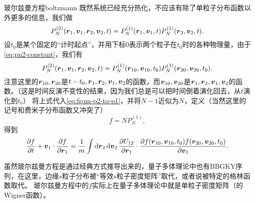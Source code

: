 \begin{back}{玻尔兹曼方程}{boltzmann}
    既然系统已经充分热化，不应该有除了单粒子分布函数以外更多的信息，我们做
    \begin{equation}
        P^{(2)}_N(\vb*{r}_1, \vb*{v}_1, \vb*{r}_2, \vb*{v}_2, t) = P^{(1)}_N(\vb*{r}_1, \vb*{v}_1, t) P^{(1)}_N(\vb*{r}_2, \vb*{v}_2, t).
    \end{equation}
    设$t_0$是某个固定的“计时起点”，并用下标0表示两个粒子在$t_0$时的各种物理量，由于\eqref{eq:pn2-constant}，我们有
    \[
        P^{(2)}_N(\vb*{r}_1, \vb*{v}_1, \vb*{r}_2, \vb*{v}_2, t) = P^{(1)}_N(\vb*{r}_{10}, \vb*{v}_{10}, t_0) P^{(1)}_N(\vb*{r}_{20}, \vb*{v}_{20}, t_0).
    \]
    注意这里的$\vb*{r}_{10}, \vb*{r}_{20}$是$t-t_0,\vb*{r}_1,\vb*{r}_2,\vb*{v}_1, \vb*{v}_2$的函数，而$\vb*{v}_{10}, \vb*{v}_{20}$是$\vb*{r}_1,\vb*{r}_2,\vb*{v}_1, \vb*{v}_2$的函数。（这是时间反演不变性的结果，因为我们总是可以把时间倒着演化回去，从$t$演化到$t_0$）
    将上式代入\eqref{eq:from-p2-to-p1}，并将$N-1$近似为$N$，定义（当然这里的记号和费米子分布函数又冲突了）
    \begin{equation}
        f=NP_N^{(1)},
    \end{equation}
    得到
    \[
        \pdv{f}{t} + \vb*{v}_1 \cdot \pdv{f}{\vb*{r}_1} = \frac{1}{m} \int \dd{\vb*{r}_2} \dd{\vb*{v}_2} \pdv{U_{12}}{\vb*{r}_1} \cdot \pdv{f(\vb*{r}_{10}, \vb*{v}_{10}, t_0) f(\vb*{r}_{20}, \vb*{v}_{20}, t_0)}{\vb*{v}_1}.
    \]

    虽然玻尔兹曼方程是通过经典方式推导出来的，量子多体理论中也有BBGKY序列，在这里，边缘$s$粒子分布被“等效$s$粒子密度矩阵”取代，或者说被特定的格林函数取代。
    玻尔兹曼方程中的$f$实际上在量子多体理论中就是单粒子密度矩阵（的Wigner函数）。
\end{back}